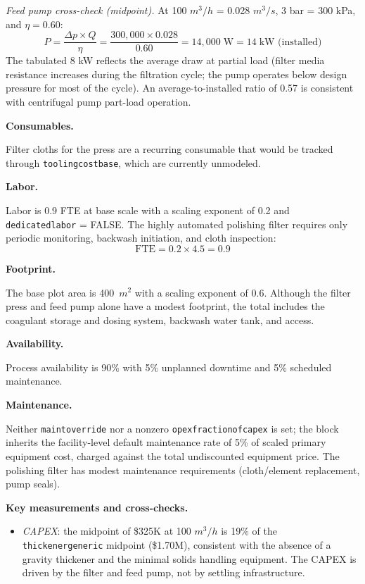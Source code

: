 \documentclass{article}
\renewcommand\_{\textunderscore\allowbreak}
\begin{document}
\textit{Feed pump cross-check (midpoint).} At 100 $\si{m^3/h}$ = 0.028 $\si{m^3/s}$, 3 bar = 300 kPa, and $\eta = 0.60$:
\[
	P = \frac{\Delta p \times Q}{\eta} = \frac{300,000 \times 0.028}{0.60} = 14,000 \;\text{W} = 14 \;\text{kW (installed)}
\]
The tabulated 8 kW reflects the average draw at partial load (filter media resistance increases during the filtration cycle; the pump operates below design pressure for most of the cycle). An average-to-installed ratio of 0.57 is consistent with centrifugal pump part-load operation.

\medskip
\noindent\textbf{Consumables.}\quad

Filter cloths for the press are a recurring consumable that would be tracked through \texttt{tooling\_cost\_base}, which are currently unmodeled.

\medskip
\noindent\textbf{Labor.}\quad

Labor is 0.9 FTE at base scale with a scaling exponent of 0.2 and \texttt{dedicated\_labor} = FALSE. The highly automated polishing filter requires only periodic monitoring, backwash initiation, and cloth inspection:
\[
	\text{FTE} = 0.2 \times 4.5 = 0.9
\]

\medskip
\noindent\textbf{Footprint.}\quad

The base plot area is 400~$\si{m^2}$ with a scaling exponent of 0.6. Although the filter press and feed pump alone have a modest footprint, the total includes the coagulant storage and dosing system, backwash water tank, and access.

\medskip
\noindent\textbf{Availability.}\quad

Process availability is 90\% with 5\% unplanned downtime and 5\% scheduled maintenance.

\medskip
\noindent\textbf{Maintenance.}\quad

Neither \texttt{maint\_override} nor a nonzero \texttt{opex\_fraction\_of\_capex} is set; the block inherits the facility-level default maintenance rate of 5\% of scaled primary equipment cost, charged against the total undiscounted equipment price. The polishing filter has modest maintenance requirements (cloth/element replacement, pump seals).

\medskip
\noindent\textbf{Key measurements and cross-checks.}\quad

\begin{itemize}[noitemsep]
	\item \textit{CAPEX}: the midpoint of \$325K at 100 $\si{m^3/h}$ is 19\% of the \texttt{thickener\_generic} midpoint (\$1.70M), consistent with the absence of a gravity thickener and the minimal solids handling equipment. The CAPEX is driven by the filter and feed pump, not by settling infrastructure.
\end{itemize}
\end{document}
